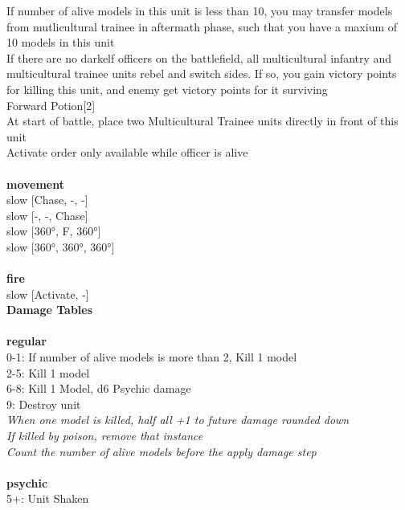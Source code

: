 {\noindent If number of alive models in this unit is less than 10, you may transfer models from mutlicultural trainee in aftermath phase, such that you have a maxium of 10 models in this unit\\ 
If there are no darkelf officers on the battlefield, all multicultural infantry and multicultural trainee units rebel and switch sides. If so, you gain victory points for killing this unit, and enemy get victory points for it surviving\\ 
Forward Potion[2]\\ 
At start of battle, place two Multicultural Trainee units directly in front of this unit\\ 
Activate order only available while officer is alive\\ 


\ \\ {\bf movement } \\
slow [Chase, -, -] \\
slow [-, -, Chase] \\
slow [360°, F, 360°] \\
slow [360°, 360°, 360°] \\
\ \\ {\bf fire } \\
slow [Activate, -] \\


{\bf Damage Tables} \\
\ \\ {\bf regular } \\
0-1: If number of alive models is more than 2, Kill 1 model \\
2-5: Kill 1 model \\
6-8: Kill 1 Model, d6 Psychic damage \\
9: Destroy unit \\
{{\it When one model is killed, half all +1 to future damage rounded down}} \\
{{\it If killed by poison, remove that instance}} \\
{{\it Count the number of alive models before the apply damage step}} \\
\ \\ {\bf psychic } \\
5+: Unit Shaken \\


}
